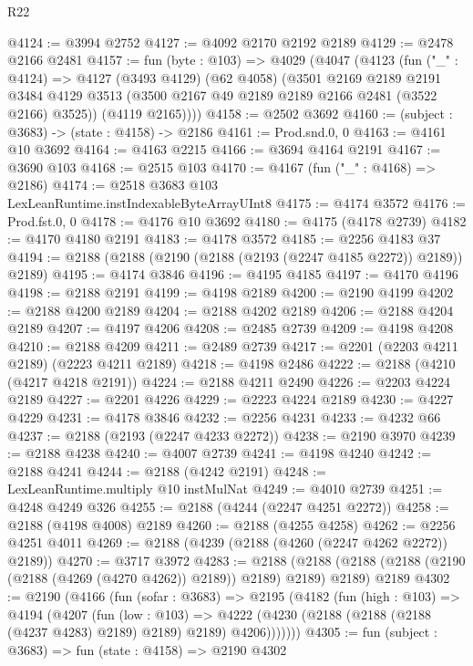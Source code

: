 \begin{lexlean}{R22}
\begin{coremodule}
@4124 := @3994 @2752
@4127 := @4092 @2170 @2192 @2189
@4129 := @2478 @2166 @2481
@4157 := fun (byte : @103) =>
  @4029
    (@4047
      (@4123
        (fun ("_" : @4124) =>
        @4127
          (@3493 @4129)
          (@62 @4058)
          (@3501
            @2169
            @2189
            @2191
            @3484
            @4129
            @3513
            (@3500 @2167 @49 @2189 @2189 @2166 @2481 (@3522 @2166) @3525))
          (@4119 @2165))))
@4158 := @2502 @3692
@4160 := (subject : @3683) -> (state : @4158) -> @2186
@4161 := Prod.snd.{0, 0}
@4163 := @4161 @10 @3692
@4164 := @4163 @2215
@4166 := @3694 @4164 @2191
@4167 := @3690 @103
@4168 := @2515 @103
@4170 := @4167 (fun ("_" : @4168) => @2186)
@4174 := @2518 @3683 @103 LexLeanRuntime.instIndexableByteArrayUInt8
@4175 := @4174 @3572
@4176 := Prod.fst.{0, 0}
@4178 := @4176 @10 @3692
@4180 := @4175 (@4178 @2739)
@4182 := @4170 @4180 @2191
@4183 := @4178 @3572
@4185 := @2256 @4183 @37
@4194 := @2188 (@2188 (@2190 (@2188 (@2193 (@2247 @4185 @2272)) @2189)) @2189)
@4195 := @4174 @3846
@4196 := @4195 @4185
@4197 := @4170 @4196
@4198 := @2188 @2191
@4199 := @4198 @2189
@4200 := @2190 @4199
@4202 := @2188 @4200 @2189
@4204 := @2188 @4202 @2189
@4206 := @2188 @4204 @2189
@4207 := @4197 @4206
@4208 := @2485 @2739
@4209 := @4198 @4208
@4210 := @2188 @4209
@4211 := @2489 @2739
@4217 := @2201 (@2203 @4211 @2189) (@2223 @4211 @2189)
@4218 := @4198 @2486
@4222 := @2188 (@4210 (@4217 @4218 @2191))
@4224 := @2188 @4211 @2490
@4226 := @2203 @4224 @2189
@4227 := @2201 @4226
@4229 := @2223 @4224 @2189
@4230 := @4227 @4229
@4231 := @4178 @3846
@4232 := @2256 @4231
@4233 := @4232 @66
@4237 := @2188 (@2193 (@2247 @4233 @2272))
@4238 := @2190 @3970
@4239 := @2188 @4238
@4240 := @4007 @2739
@4241 := @4198 @4240
@4242 := @2188 @4241
@4244 := @2188 (@4242 @2191)
@4248 := LexLeanRuntime.multiply @10 instMulNat
@4249 := @4010 @2739
@4251 := @4248 @4249 @326
@4255 := @2188 (@4244 (@2247 @4251 @2272))
@4258 := @2188 (@4198 @4008) @2189
@4260 := @2188 (@4255 @4258)
@4262 := @2256 @4251 @4011
@4269 := @2188 (@4239 (@2188 (@4260 (@2247 @4262 @2272)) @2189))
@4270 := @3717 @3972
@4283 := @2188
    (@2188 (@2188 (@2188 (@2190 (@2188 (@4269 (@4270 @4262)) @2189)) @2189) @2189) @2189)
    @2189
@4302 := @2190
    (@4166
      (fun (sofar : @3683) =>
      @2195
        (@4182
          (fun (high : @103) =>
          @4194
            (@4207
              (fun (low : @103) =>
              @4222 (@4230 (@2188 (@2188 (@2188 (@4237 @4283) @2189) @2189) @2189) @4206)))))))
@4305 := fun (subject : @3683) => fun (state : @4158) => @2190 @4302

\end{coremodule}
\end{lexlean}
